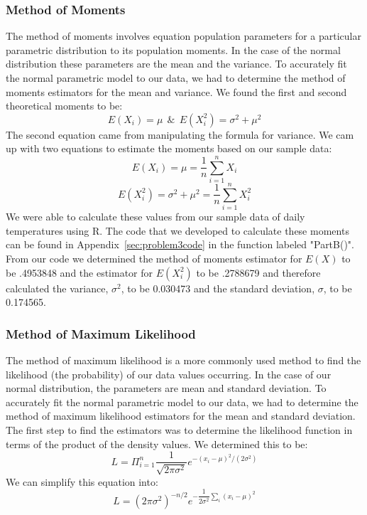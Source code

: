 \documentclass[11pt]{article}
\begin{document}
\subsubsection{Method of Moments}
\label{subsubsec:methodofmoments}
The method of moments involves equation population parameters for a particular parametric distribution to its population moments. In the case of the normal distribution these parameters are the mean and the variance. To accurately fit the normal parametric model to our data, we had to determine the method of moments estimators for the mean and variance. We found the first and second theoretical moments to be: 
\begin{equation}
E(X_i) = \mu\ \ \&\ \ E(X_i^2) = \sigma ^ 2 + \mu ^ 2
\end{equation}
The second equation came from manipulating the formula for variance. We cam up with two equations to estimate the moments based on our sample data:
\begin{equation}
E(X_i) = \mu = \frac{1}{n} \sum_{i=1}^n X_i
\end{equation}
\begin{equation}
E(X_i^2) = \sigma ^ 2 + \mu ^ 2 = \frac{1}{n} \sum_{i=1}^{n} X_i^2
\end{equation}
We were able to calculate these values from our sample data of daily temperatures using R. The code that we developed to calculate these moments can be found in Appendix~\ref{sec:problem3code} in the function labeled "PartB()". From our code we determined the method of moments estimator for $E(X)$ to be .4953848 and the estimator for $E(X_i^2)$ to be .2788679 and therefore calculated the variance, $\sigma^2$, to be 0.030473 and the standard deviation, $\sigma$, to be 0.174565.
 
\subsubsection{Method of Maximum Likelihood}
\label{subsubsec:maximumlikelihood}
The method of maximum likelihood is a more commonly used method to find the likelihood (the probability) of our data values occurring. In the case of our normal distribution, the parameters are mean and standard deviation. To accurately fit the normal parametric model to our data, we had to determine the method of maximum likelihood estimators for the mean and standard deviation. The first step to find the estimators was to determine the likelihood function in terms of the product of the density values. We determined this to be:
\begin{equation}
L=\Pi_{i=1}^{n}\dfrac{1}{\sqrt{2\pi\sigma^2}}e^{-(x_i-\mu)^2/(2\sigma^2)}
\end{equation}
We can simplify this equation into:
\begin{equation}
L=(2\pi\sigma^2)^{-n/2}e^{-\dfrac{1}{2\sigma^2}\sum_{i}(x_i-\mu)^2}
\end{equation}
\end{document}
